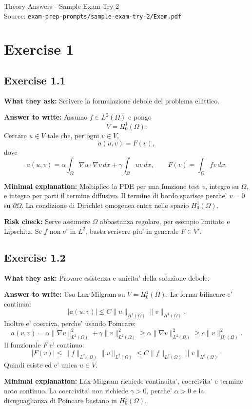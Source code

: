 \documentclass[11pt,a4paper]{article}
\begin{document}
\begin{center}
{\Large Theory Answers - Sample Exam Try 2}\\
\small Source: \texttt{exam-prep-prompts/sample-exam-try-2/Exam.pdf}
\end{center}

\section*{Exercise 1}

\subsection*{Exercise 1.1}
\textbf{What they ask:} Scrivere la formulazione debole del problema ellittico.

\textbf{Answer to write:}
Assumo \(f\in L^2(\Omega)\) e pongo
\[
V=H^1_0(\Omega).
\]
Cercare \(u\in V\) tale che, per ogni \(v\in V\),
\[
a(u,v)=F(v),
\]
dove
\[
a(u,v)=\alpha\int_\Omega \nabla u\cdot\nabla v\,dx
+\gamma\int_\Omega uv\,dx,
\qquad
F(v)=\int_\Omega fv\,dx.
\]

\textbf{Minimal explanation:}
Moltiplico la PDE per una funzione test \(v\), integro su \(\Omega\), e integro per parti il termine diffusivo. Il termine di bordo sparisce perche' \(v=0\) su \(\partial\Omega\). La condizione di Dirichlet omogenea entra nello spazio \(H^1_0(\Omega)\).

\textbf{Risk check:}
Serve assumere \(\Omega\) abbastanza regolare, per esempio limitato e Lipschitz. Se \(f\) non e' in \(L^2\), basta scrivere piu' in generale \(F\in V'\).

\subsection*{Exercise 1.2}
\textbf{What they ask:} Provare esistenza e unicita' della soluzione debole.

\textbf{Answer to write:}
Uso Lax-Milgram su \(V=H^1_0(\Omega)\). La forma bilineare e' continua:
\[
|a(u,v)|\le C\|u\|_{H^1(\Omega)}\|v\|_{H^1(\Omega)}.
\]
Inoltre e' coerciva, perche' usando Poincare:
\[
a(v,v)=\alpha\|\nabla v\|^2_{L^2(\Omega)}
+\gamma\|v\|^2_{L^2(\Omega)}
\ge \alpha\|\nabla v\|^2_{L^2(\Omega)}
\ge c\|v\|^2_{H^1(\Omega)}.
\]
Il funzionale \(F\) e' continuo:
\[
|F(v)|\le \|f\|_{L^2(\Omega)}\|v\|_{L^2(\Omega)}
\le C\|f\|_{L^2(\Omega)}\|v\|_{H^1(\Omega)}.
\]
Quindi esiste ed e' unica \(u\in V\).

\textbf{Minimal explanation:}
Lax-Milgram richiede continuita', coercivita' e termine noto continuo. La coercivita' non richiede \(\gamma>0\), perche' \(\alpha>0\) e la disuguaglianza di Poincare bastano in \(H^1_0(\Omega)\).
\end{document}
